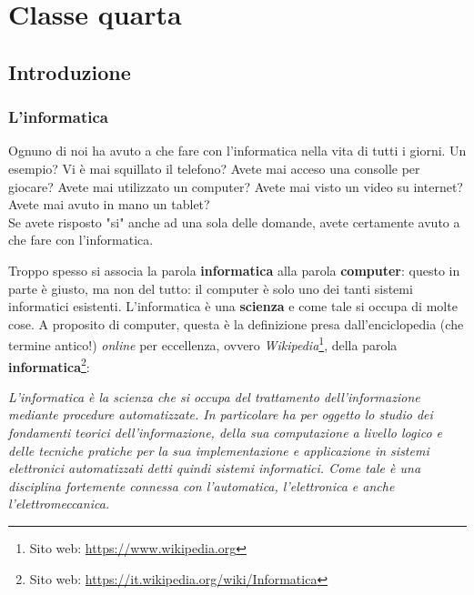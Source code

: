 \documentclass[12pt,fleqn,a4paper]{book} %
\begin{document}
    
    \part{Classe quarta}
    \label{part: Classe quarta}
    
    
    
    \chapter{Introduzione}
    \label{cap: Introduzione}
        
        \section{L'informatica}
        \label{sec: L'informatica oggi}
    		Ognuno di noi ha avuto a che fare con l'informatica nella vita di tutti i giorni. Un esempio? Vi è mai squillato il telefono? Avete mai acceso una consolle per giocare? Avete mai utilizzato un computer? Avete mai visto un video su internet? Avete mai avuto in mano un tablet?\\ Se avete risposto "si" anche ad una sola delle domande, avete certamente avuto a che fare con l'informatica.
    		
    		Troppo spesso si associa la parola \textbf{informatica} alla parola \textbf{computer}: questo in parte è giusto, ma non del tutto: il computer è solo uno dei tanti sistemi informatici esistenti. L'informatica è una \textbf{scienza} e come tale si occupa di molte cose.
    		A proposito di computer, questa è la definizione presa dall'enciclopedia (che termine antico!) \textit{online} per eccellenza, ovvero \textit{Wikipedia}\footnote{Sito web: \url{https://www.wikipedia.org}}, della parola \textbf{informatica}\footnote{Sito web: \url{https://it.wikipedia.org/wiki/Informatica}}:    		
    		\begin{definition}[Informatica]\label{def: Informatica}
    			\textit{L'informatica è la scienza che si occupa del trattamento dell'informazione mediante procedure automatizzate. In particolare ha per oggetto lo studio dei fondamenti teorici dell'informazione, della sua computazione a livello logico e delle tecniche pratiche per la sua implementazione e applicazione in sistemi elettronici automatizzati detti quindi sistemi informatici. Come tale è una disciplina fortemente connessa con l'automatica, l'elettronica e anche l'elettromeccanica.}
    		\end{definition}
    	
\end{document}
